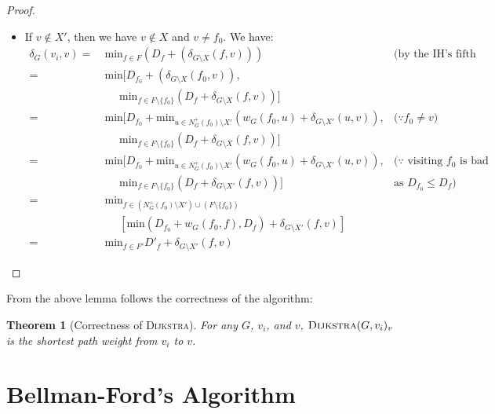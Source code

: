 \documentclass[11pt,a4paper,oneside,microtype,chapter,nokorean]{oblivoir}
\newtheorem{theorem}{Theorem}
\begin{document}
\begin{proof}
\begin{itemize}
\begin{itemize}
    \item If $v \notin X'$, then we have $v \notin X$ and $v \neq f_0$.  We have:
      \begin{align*}
        \delta_G(v_i,v) =&~ \textrm{min}_{f \in F} (D_f + (\delta_{G \setminus X}(f,v))) & \mbox{(by the IH's
                                                                                           fifth cond.)} \\
        =&~ \textrm{min} [ D_{f_0} + (\delta_{G \setminus X}(f_0,v)), \\
                         &~ ~~~~~~\textrm{min}_{f \in F \setminus \{f_0\}} (D_f + \delta_{G \setminus X}(f,v)) ] \\
        =&~ \textrm{min} [ D_{f_0} + \textrm{min}_{u \in N^+_G(f_0) \setminus X'}(w_G(f_0,u) + \delta_{G \setminus X'}(u,v)), & \mbox{($\because f_0 \neq v$)} \\
                         &~ ~~~~~~\textrm{min}_{f \in F \setminus \{f_0\}} (D_f + \delta_{G \setminus X}(f,v)) ] \\
        =&~ \textrm{min} [ D_{f_0} + \textrm{min}_{u \in N^+_G(f_0) \setminus X'}(w_G(f_0,u) + \delta_{G \setminus X'}(u,v)), & \mbox{($\because$ visiting $f_0$ is bad} \\
                         &~ ~~~~~~\textrm{min}_{f \in F \setminus \{f_0\}} (D_f + \delta_{G \setminus X'}(f,v)) ] & \mbox{as $D_{f_0} \le D_f$)} \\
        =&~ \textrm{min}_{f \in (N^+_G(f_0) \setminus X') \cup (F \setminus \{f_0\})} \\
        &~ ~~~~~~[\textrm{min}(D_{f_0} + w_G(f_0,f), D_f) + \delta_{G \setminus X'}(f,v)] \\
        =&~ \textrm{min}_{f \in F'} D'_f + \delta_{G \setminus X'}(f,v)
      \end{align*}
    \end{itemize}
  \end{itemize}
\end{proof}


From the above lemma follows the correctness of the algorithm:

\begin{theorem}[Correctness of \textsc{Dijkstra}] For any $G$, $v_i$, and $v$,
  $\textsc{Dijkstra}(G,v_i)_v$ is the shortest path weight from $v_i$ to $v$.
\end{theorem}



\section{Bellman-Ford's Algorithm}
\end{document}

